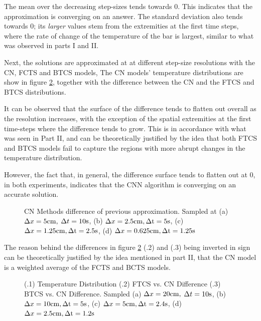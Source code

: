 \documentclass[a4paper]{article} %
\begin{document}
\begin{multicols}{2}
The mean over the decreasing step-sizes tends towards 0. This indicates that the approximation is converging on an answer. The standard deviation also tends towards 0; its \textit{larger} values stem from the extremities at the first time steps, where the rate of change of the temperature of the bar is largest, similar to what was observed in parts I and II.

Next, the solutions are approximated at at different step-size resolutions with the CN, FCTS and BTCS models, The CN models' temperature distributions are show in figure \ref{fig:p3_c}, together with the difference between the CN and the FTCS and BTCS distributions.

It can be observed that the surface of the difference tends to flatten out overall as the resolution increases, with the exception of the spatial extremities at the first time-steps where the difference tends to grow. This is in accordance with what was seen in Part II, and can be theoretically justified by the idea that both FTCS and BTCS models fail to capture the regions with more abrupt changes in the temperature distribution.  

However, the fact that, in general, the difference surface tends to flatten out at 0, in both experiments, indicates that the CNN algorithm is converging on an accurate solution.
    
\end{multicols}
\begin{figure}[H]
    \hspace*{-0.5cm}
    
    \caption{CN Methods difference of previous approximation. Sampled at (a) $\Delta x = 5\rm{cm},$ $\Delta t = 10\rm{s}$, (b) $\Delta x = 2.5\rm{cm}, \Delta t = 5\rm{s}$, (c) $\Delta x = 1.25\rm{cm}, \Delta t = 2.5\rm{s}$, (d) $\Delta x = 0.625\rm{cm}, \Delta t = 1.25\rm{s}$}
    \label{fig:p3_d}
\end{figure}

The reason behind the differences in figure \ref{fig:p3_c} (.2) and (.3) being inverted in sign can be theoretically justified by the idea mentioned in part II, that the CN model is a weighted average of the FCTS and BCTS models. 

\begin{figure}[H]
    \hspace*{-0.5cm}
    
    \caption{(.1) Temperature Distribution (.2) FTCS vs. CN Difference (.3) BTCS vs. CN Difference. Sampled (a) $\Delta x = 20\rm{cm},$ $\Delta t = 10\rm{s}$, (b) $\Delta x = 10\rm{cm}, \Delta t = 5\rm{s}$, (c) $\Delta x = 5\rm{cm}, \Delta t = 2.4\rm{s}$, (d) $\Delta x = 2.5\rm{cm}, \Delta t = 1.2\rm{s}$}
    \label{fig:p3_c}
\end{figure}
\end{document}
